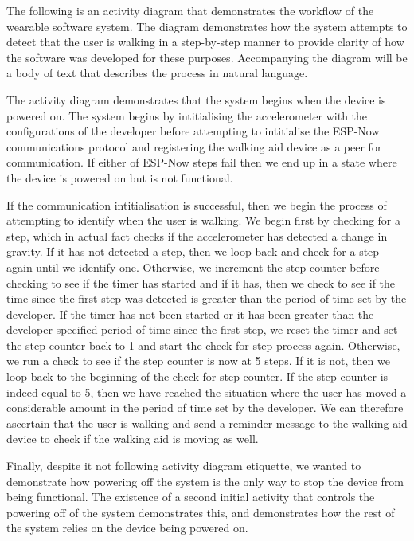                 The following is an activity diagram that demonstrates the workflow of the wearable software system. The diagram demonstrates how the system attempts to detect that the user is walking in a step-by-step manner to provide clarity of how the software was developed for these purposes. Accompanying the diagram will be a body of text that describes the process in natural language.

                

                The activity diagram demonstrates that the system begins when the device is powered on. The system begins by intitialising the accelerometer with the configurations of the developer before attempting to intitialise the ESP-Now communications protocol and registering the walking aid device as a peer for communication. If either of ESP-Now steps fail then we end up in a state where the device is powered on but is not functional. 

                If the communication intitialisation is successful, then we begin the process of attempting to identify when the user is walking. We begin first by checking for a step, which in actual fact checks if the accelerometer has detected a change in gravity. If it has not detected a step, then we loop back and check for a step again until we identify one. Otherwise, we increment the step counter before checking to see if the timer has started and if it has, then we check to see if the time since the first step was detected is greater than the period of time set by the developer. If the timer has not been started or it has been greater than the developer specified period of time since the first step, we reset the timer and set the step counter back to 1 and start the check for step process again. Otherwise, we run a check to see if the step counter is now at 5 steps. If it is not, then we loop back to the beginning of the check for step counter. If the step counter is indeed equal to 5, then we have reached the situation where the user has moved a considerable amount in the period of time set by the developer. We can therefore ascertain that the user is walking and send a reminder message to the walking aid device to check if the walking aid is moving as well.

                Finally, despite it not following activity diagram etiquette, we wanted to demonstrate how powering off the system is the only way to stop the device from being functional. The existence of a second initial activity that controls the powering off of the system demonstrates this, and demonstrates how the rest of the system relies on the device being powered on.

